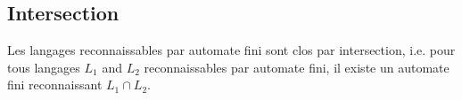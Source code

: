 


\subsection{Intersection}

\begin{theorem}
Les langages reconnaissables par automate fini sont clos par intersection, i.e. pour tous langages $L_1$ and $L_2$ reconnaissables par automate fini, il existe un automate fini reconnaissant $L_1 \cap L_2$.
\end{theorem}

